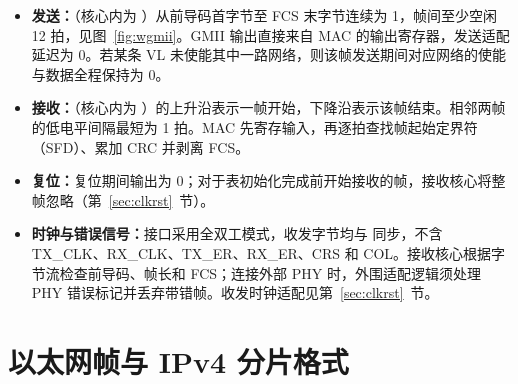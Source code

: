 \begin{itemize}
  \item \textbf{发送：}（核心内为 ）从前导码首字节至 FCS 末字节连续为 1，帧间至少空闲 12 拍，见图~\ref{fig:wgmii}。GMII 输出直接来自 MAC 的输出寄存器，发送适配延迟为 0。若某条 VL 未使能其中一路网络，则该帧发送期间对应网络的使能与数据全程保持为 0。
  \item \textbf{接收：}（核心内为 ）的上升沿表示一帧开始，下降沿表示该帧结束。相邻两帧的低电平间隔最短为 1 拍。MAC 先寄存输入，再逐拍查找帧起始定界符（SFD）、累加 CRC 并剥离 FCS。
  \item \textbf{复位：}复位期间输出为 0；对于表初始化完成前开始接收的帧，接收核心将整帧忽略（第~\ref{sec:clkrst}~节）。
  \item \textbf{时钟与错误信号：}接口采用全双工模式，收发字节均与  同步，不含 TX\_CLK、RX\_CLK、TX\_ER、RX\_ER、CRS 和 COL。接收核心根据字节流检查前导码、帧长和 FCS；连接外部 PHY 时，外围适配逻辑须处理 PHY 错误标记并丢弃带错帧。收发时钟适配见第~\ref{sec:clkrst}~节。
\end{itemize}


\section{以太网帧与 IPv4 分片格式}\label{sec:frame}

